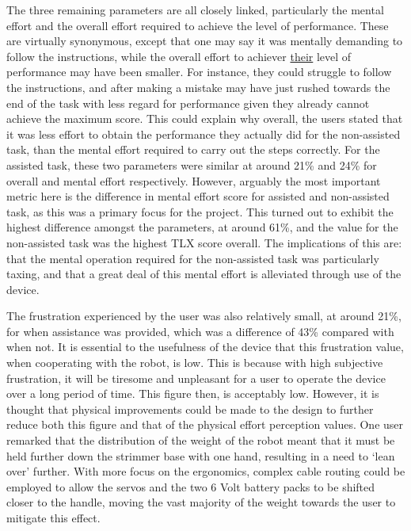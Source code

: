 \documentclass[11pt]{article}
\begin{document}
The three remaining parameters are all closely linked, particularly the mental effort and the overall effort required to achieve the level of performance. These are virtually synonymous, except that one may say it was mentally demanding to follow the instructions, while the overall effort to achiever \underline{their} level of performance may have been smaller. For instance, they could struggle to follow the instructions, and after making a mistake may have just rushed towards the end of the task with less regard for performance given they already cannot achieve the maximum score. This could explain why overall, the users stated that it was less effort to obtain the performance they actually did for the non-assisted task, than the mental effort required to carry out the steps correctly. For the assisted task, these two parameters were similar at around 21\% and 24\% for overall and mental effort respectively. However, arguably the most important metric here is the difference in mental effort score for assisted and non-assisted task, as this was a primary focus for the project. This turned out to exhibit the highest difference amongst the parameters, at around 61\%, and the value for the non-assisted task was the highest TLX score overall. The implications of this are: that the mental operation required for the non-assisted task was particularly taxing, and that a great deal of this mental effort is alleviated through use of the device.

The frustration experienced by the user was also relatively small, at around 21\%, for when assistance was provided, which was a difference of 43\% compared with when not. It is essential to the usefulness of the device that this frustration value, when cooperating with the robot, is low. This is because with high subjective frustration, it will be tiresome and unpleasant for a user to operate the device over a long period of time. This figure then, is acceptably low. However, it is thought that physical improvements could be made to the design to further reduce both this figure and that of the physical effort perception values. One user remarked that the distribution of the weight of the robot meant that it must be held further down the strimmer base with one hand, resulting in a need to `lean over' further. With more focus on the ergonomics, complex cable routing could be employed to allow the servos and the two 6 Volt battery packs to be shifted closer to the handle, moving the vast majority of the weight towards the user to mitigate this effect.
\end{document}
